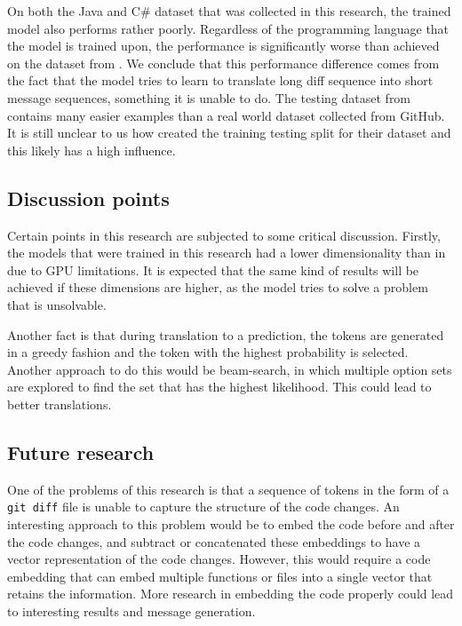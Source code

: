 On both the Java and C\# dataset that was collected in this research, the trained model also performs rather poorly. Regardless of the programming language that the model is trained upon, the performance is significantly worse than achieved on the dataset from \cite{jiang_automatically_2017}. We conclude that this performance difference comes from the fact that the model tries to learn to translate long diff sequence into short message sequences, something it is unable to do. The testing dataset from \cite{jiang_automatically_2017} contains many easier examples than a real world dataset collected from GitHub. It is still unclear to us how \citeauthor{jiang_automatically_2017} created the training testing split for their dataset and this likely has a high influence.

\subsection{Discussion points}
Certain points in this research are subjected to some critical discussion. Firstly, the models that were trained in this research had a lower dimensionality than in \cite{jiang_automatically_2017} due to GPU limitations. It is expected that the same kind of results will be achieved if these dimensions are higher, as the model tries to solve a problem that is unsolvable. 

Another fact is that during translation to a prediction, the tokens are generated in a greedy fashion and the token with the highest probability is selected. Another approach to do this would be beam-search, in which multiple option sets are explored to find the set that has the highest likelihood. This could lead to better translations.

\subsection{Future research}
One of the problems of this research is that a sequence of tokens in the form of a \texttt{git diff} file is unable to capture the structure of the code changes. An interesting approach to this problem would be to embed the code before and after the code changes, and subtract or concatenated these embeddings to have a vector representation of the code changes. However, this would require a code embedding that can embed multiple functions or files into a single vector that retains the information. More research in embedding the code properly could lead to interesting results and message generation.

